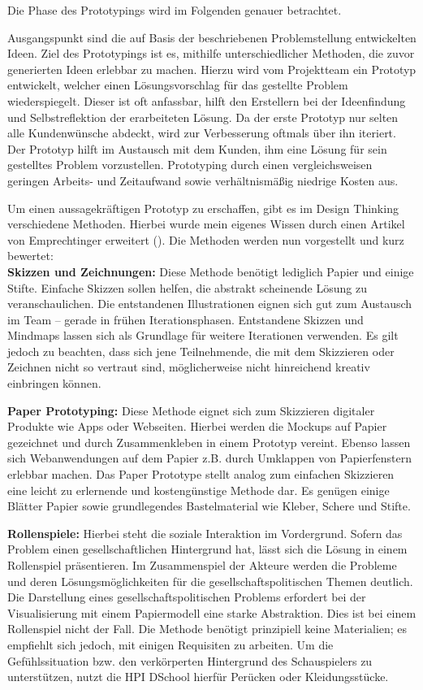 Die Phase des Prototypings wird im Folgenden genauer betrachtet.

Ausgangspunkt sind die auf Basis der beschriebenen Problemstellung entwickelten Ideen. Ziel des Prototypings ist es, mithilfe unterschiedlicher Methoden, die zuvor generierten Ideen erlebbar zu machen. Hierzu wird vom Projektteam ein Prototyp entwickelt, welcher einen Lösungsvorschlag für das gestellte Problem wiederspiegelt. Dieser ist oft anfassbar, hilft den Erstellern bei der Ideenfindung und Selbstreflektion der erarbeiteten Lösung. Da der erste Prototyp nur selten alle Kundenwünsche abdeckt, wird zur Verbesserung oftmals über ihn iteriert. Der Prototyp hilft im Austausch mit dem Kunden, ihm eine Lösung für sein gestelltes Problem vorzustellen. Prototyping durch einen vergleichsweisen geringen Arbeits- und Zeitaufwand sowie verhältnismäßig niedrige Kosten aus.

Um einen aussagekräftigen Prototyp zu erschaffen, gibt es im Design Thinking verschiedene Methoden. Hierbei wurde mein eigenes Wissen durch einen Artikel von Emprechtinger erweitert (\cite{prototyping_methoden}). Die Methoden werden nun vorgestellt und kurz bewertet: \\

\textbf{Skizzen und Zeichnungen:}	Diese Methode benötigt lediglich Papier und einige Stifte. Einfache Skizzen sollen helfen, die abstrakt scheinende Lösung zu veranschaulichen. Die entstandenen Illustrationen eignen sich gut zum Austausch im Team – gerade in frühen Iterationsphasen. Entstandene Skizzen und Mindmaps lassen sich als Grundlage für weitere Iterationen verwenden. Es gilt jedoch zu beachten, dass sich jene Teilnehmende, die mit dem Skizzieren oder Zeichnen nicht so vertraut sind, möglicherweise nicht hinreichend kreativ einbringen können.

\textbf{Paper Prototyping:} Diese Methode eignet sich zum Skizzieren digitaler Produkte wie Apps oder Webseiten. Hierbei werden die Mockups auf Papier gezeichnet und durch Zusammenkleben in einem Prototyp vereint. Ebenso lassen sich Webanwendungen auf dem Papier z.B. durch Umklappen von Papierfenstern erlebbar machen. Das Paper Prototype stellt analog zum einfachen Skizzieren eine leicht zu erlernende und kostengünstige Methode dar. Es genügen einige Blätter Papier sowie grundlegendes Bastelmaterial wie Kleber, Schere und Stifte.

\textbf{Rollenspiele:}	Hierbei steht die soziale Interaktion im Vordergrund. Sofern das Problem einen gesellschaftlichen Hintergrund hat, lässt sich die Lösung in einem Rollenspiel präsentieren. Im Zusammenspiel der Akteure werden die Probleme und deren Lösungsmöglichkeiten für die gesellschaftspolitischen Themen deutlich. Die Darstellung eines gesellschaftspolitischen Problems erfordert bei der Visualisierung mit einem Papiermodell eine starke Abstraktion. Dies ist bei einem Rollenspiel nicht der Fall. \newline
Die Methode benötigt prinzipiell keine Materialien; es empfiehlt sich jedoch, mit einigen Requisiten zu arbeiten. Um die Gefühlssituation bzw. den verkörperten Hintergrund des Schauspielers zu unterstützen, nutzt die HPI DSchool hierfür Perücken oder Kleidungsstücke.


